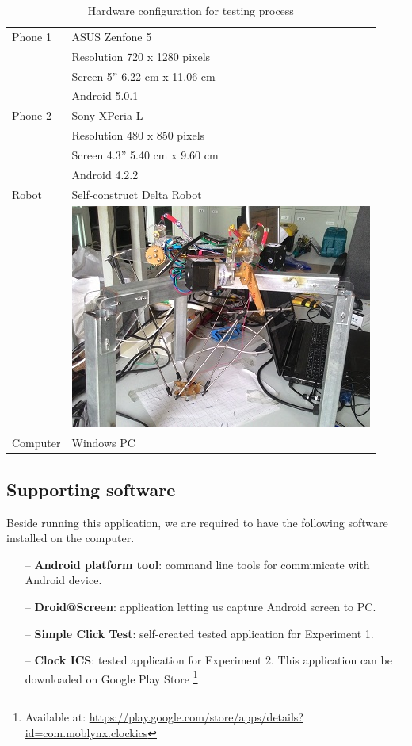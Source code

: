\begin{table}[H]
	\centering
	\caption{Hardware configuration for testing process}	
	\label{tab:hw}
	\begin{tabularx}{0.65\textwidth}{ll}
		\toprule
		Phone 1 & ASUS Zenfone 5 \\
			  & Resolution 720 x 1280 pixels \\
			  & Screen 5'' 6.22 cm x 11.06 cm \\
			  & Android 5.0.1\\
		\midrule 
		Phone 2 & Sony XPeria L \\
			  & Resolution 480 x 850 pixels \\
			  & Screen 4.3'' 5.40 cm x 9.60 cm \\
			  & Android 4.2.2\\
		\midrule 
		Robot & Self-construct Delta Robot \\
			  & \begin{minipage}{0.5\linewidth}
			\includegraphics[width=0.8\linewidth]{Chapters/Fig/delta_robot.jpg}
		\end{minipage} \\
		\midrule 
		Computer & Windows PC \\
		\bottomrule
	\end{tabularx}
\end{table}

\subsection{Supporting software}
Beside running this application, we are required to have the following software installed on the computer.

	\begin{itemize}
		\item[--] \textbf{Android platform tool}: command line tools for communicate with Android device.
		\item[--] \textbf{Droid@Screen}: application letting us capture Android screen to PC.
		\item[--] \textbf{Simple Click Test}: self-created tested application for Experiment 1.
		\item[--] \textbf{Clock ICS}: tested application for Experiment 2. This application can be downloaded on Google Play Store \footnote{Available at: \url{https://play.google.com/store/apps/details?id=com.moblynx.clockics}}
	\end{itemize}

